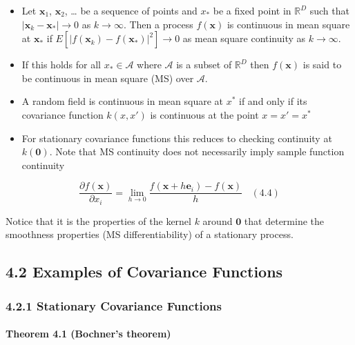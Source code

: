 \documentclass[
]{article}
\begin{document}
\begin{itemize}
\item
  Let \(\pmb x_1\), \(\pmb x_2\), \ldots{} be a sequence of points and
  \(x_*\) be a fixed point in \(\mathbb R^D\) such that
  \(|\pmb x_k - \pmb x_*| \rightarrow 0\) as \(k \rightarrow \infty\).
  Then a process \(f(\pmb x)\) is continuous in mean square at
  \(\pmb x_*\) if \(E[|f(\pmb x_k) - f(\pmb x_*)|^2] \rightarrow 0\) as
  mean square continuity as \(k \rightarrow \infty\).
\item
  If this holds for all \(x_* \in \mathcal A\) where \(\mathcal A\) is a
  subset of \(\mathbb R^D\) then \(f(\pmb x)\) is said to be continuous
  in mean square (MS) over \(\mathcal A\).
\item
  A random field is continuous in mean square at \(x^*\) if and only if
  its covariance function \(k(x, x')\) is continuous at the point
  \(x = x' = x^*\)
\item
  For stationary covariance functions this reduces to checking
  continuity at \(k(\pmb 0)\). Note that MS continuity does not
  necessarily imply sample function continuity
\end{itemize}

\[
\frac {\partial f(\pmb x)}
{\partial x_i} = \lim_ {h \rightarrow 0} 
\frac {f(\pmb x + h \pmb e_i) - f(\pmb x)} {h}
\ \ \ \ (4.4)
\]

Notice that it is the properties of the kernel \(k\) around \(\pmb 0\)
that determine the smoothness properties (MS differentiability) of a
stationary process.

\hypertarget{examples-of-covariance-functions}{%
\subsection{4.2 Examples of Covariance
Functions}\label{examples-of-covariance-functions}}

\hypertarget{stationary-covariance-functions}{%
\subsubsection{4.2.1 Stationary Covariance
Functions}\label{stationary-covariance-functions}}

\hypertarget{theorem-4.1-bochners-theorem}{%
\paragraph{Theorem 4.1 (Bochner's
theorem)}\label{theorem-4.1-bochners-theorem}}
\end{document}
